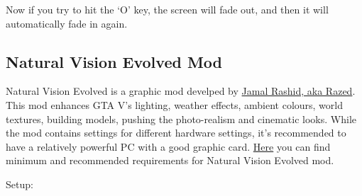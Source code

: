 \documentclass[
  openany]{book}
\begin{document}
Now if you try to hit the `O' key, the screen will fade out, and then it will automatically fade in again.

\hypertarget{natural-vision-evolved-mod}{%
\subsection*{Natural Vision Evolved Mod}\label{natural-vision-evolved-mod}}

Natural Vision Evolved is a graphic mod develped by \href{https://www.razedmods.com/}{Jamal Rashid, aka Razed}. This mod enhances GTA V's lighting, weather effects, ambient colours, world textures, building models, pushing the photo-realism and cinematic looks. While the mod contains settings for different hardware settings, it's recommended to have a relatively powerful PC with a good graphic card. \href{https://www.systemrequirementslab.com/cyri/requirements/gta-5-naturalvision-remastered/16594}{Here} you can find minimum and recommended requirements for Natural Vision Evolved mod.

Setup:
\end{document}
